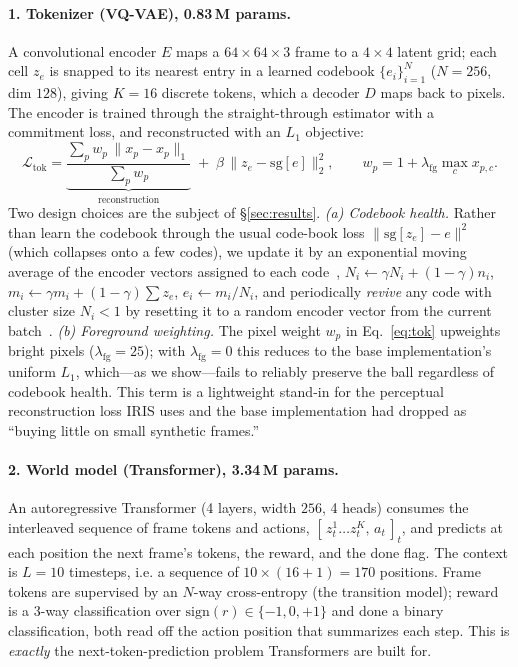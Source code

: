\documentclass[11pt]{article}
\begin{document}
\paragraph{1. Tokenizer (VQ-VAE), 0.83\,M params.}
A convolutional encoder $E$ maps a $64{\times}64{\times}3$ frame to a
$4{\times}4$ latent grid; each cell $z_e$ is snapped to its nearest entry in a
learned codebook $\{e_i\}_{i=1}^{N}$ ($N{=}256$, dim $128$), giving $K{=}16$
discrete tokens, which a decoder $D$ maps back to pixels. The encoder is trained
through the straight-through estimator with a commitment loss, and reconstructed
with an $L_1$ objective:
\begin{equation}
\mathcal{L}_{\text{tok}} = \underbrace{\frac{\sum_{p} w_p\,\lVert x_p-\hat
x_p\rVert_1}{\sum_p w_p}}_{\text{reconstruction}}
\;+\; \beta\,\lVert z_e-\mathrm{sg}[e]\rVert_2^2,
\qquad w_p = 1 + \lambda_{\text{fg}}\max_c x_{p,c}.
\label{eq:tok}
\end{equation}
Two design choices are the subject of \S\ref{sec:results}. \emph{(a) Codebook
health.} Rather than learn the codebook through the usual code-book loss
$\lVert\mathrm{sg}[z_e]-e\rVert^2$ (which collapses onto a few codes), we update
it by an exponential moving average of the encoder vectors assigned to each
code~\cite{vqvae,vqvae2}, $N_i\!\leftarrow\!\gamma N_i+(1{-}\gamma)n_i$,
$m_i\!\leftarrow\!\gamma m_i+(1{-}\gamma)\!\sum z_e$, $e_i\!\leftarrow\!m_i/N_i$,
and periodically \emph{revive} any code with cluster size $N_i<1$ by resetting it
to a random encoder vector from the current batch~\cite{jukebox}. \emph{(b)
Foreground weighting.} The pixel weight $w_p$ in Eq.~\ref{eq:tok} upweights bright
pixels ($\lambda_{\text{fg}}{=}25$); with $\lambda_{\text{fg}}{=}0$ this reduces
to the base implementation's uniform $L_1$, which---as we show---fails to
reliably preserve the ball regardless of codebook health. This term is a
lightweight stand-in for the
perceptual reconstruction loss IRIS uses and the base implementation had dropped
as ``buying little on small synthetic frames.''

\paragraph{2. World model (Transformer), 3.34\,M params.}
An autoregressive Transformer (4 layers, width $256$, 4 heads) consumes the
interleaved sequence of frame tokens and actions,
$[\,z_t^{1}\!\dots z_t^{K},\,a_t\,]_{t}$, and predicts at each position the next
frame's tokens, the reward, and the done flag. The context is $L{=}10$
timesteps, i.e. a sequence of $10\times(16{+}1){=}170$ positions. Frame tokens
are supervised by an $N$-way cross-entropy (the transition model); reward is a
$3$-way classification over $\mathrm{sign}(r)\in\{-1,0,+1\}$ and done a binary
classification, both read off the action position that summarizes each step.
This is \emph{exactly} the next-token-prediction problem Transformers are built
for.
\end{document}
